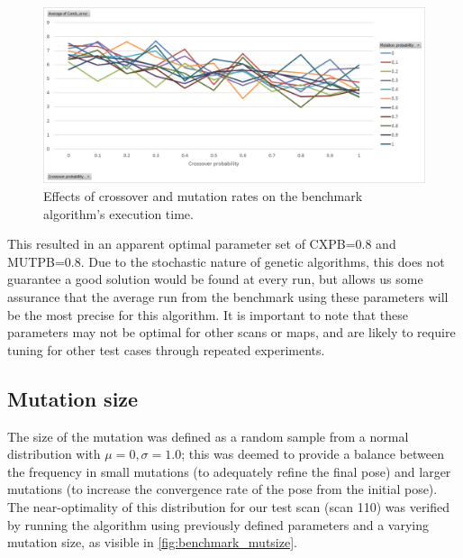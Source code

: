 \documentclass[authoryearcitations]{UoYCSproject}
\begin{document}
\begin{figure}[ht]
\centering
	\includegraphics[width=\textwidth,keepaspectratio]{images/ga_cxpb_mutpb.png}
	\caption[Optimising cross and mutation rate for benchmark algorithm.]{Effects of crossover and mutation rates on the benchmark algorithm's execution time.}
	\label{fig:ga_cxpb_mutpb}
\end{figure}

 This resulted in an apparent optimal parameter set of CXPB=0.8 and MUTPB=0.8. Due to the stochastic nature of genetic algorithms, this does not guarantee a good solution would be found at every run, but allows us some assurance that the average run from the benchmark using these parameters will be the most precise for this algorithm. It is important to note that these parameters may not be optimal for other scans or maps, and are likely to require tuning for other test cases through repeated experiments. 


\subsection{Mutation size}

The size of the mutation was defined as a random sample from a normal distribution with $\mu=0, \sigma=1.0$; this was deemed to provide a balance between the frequency in small mutations (to adequately refine the final pose) and larger mutations (to increase the convergence rate of the pose from the initial pose). The near-optimality of this distribution for our test scan (scan 110) was verified by running the algorithm using previously defined parameters and a varying mutation size, as visible in \autoref{fig:benchmark_mutsize}.

\datatablebenchmarkmutsize
\end{document}
